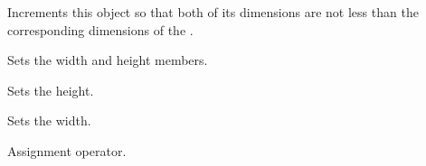 
Increments this object so that both of its dimensions are not less than the
corresponding dimensions of the .




\label{wxsizeset}


Sets the width and height members.

\label{wxsizesetheight}


Sets the height.

\label{wxsizesetwidth}


Sets the width.



Assignment operator.


